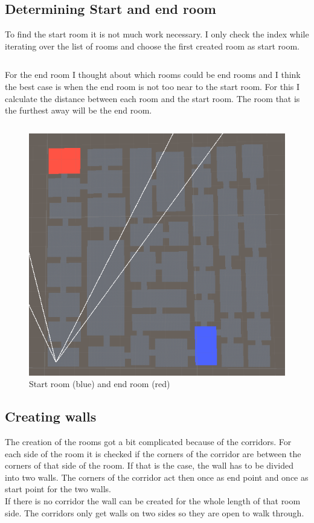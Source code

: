 \documentclass[a4paper,11pt,oneside]{scrreprt}
\begin{document}
\newpage
\subsection{Determining Start and end room}
To find the start room it is not much work necessary. I only check the index while iterating over the list of rooms and choose the first created room as start room. 
\inputminted[fontsize=\footnotesize,linenos]{csharp}{code/StartRoom.cs}

For the end room I thought about which rooms could be end rooms and I think the best case is when the end room is not too near to the start room. For this I calculate the distance between each room and the start room. The room that is the furthest away will be the end room.
\inputminted[fontsize=\footnotesize,linenos]{csharp}{code/EndRoom.cs}

\begin{figure}[htb]
	\centering
	\includegraphics[scale=0.7]{images/start_end_room.png}   
	\caption{Start room (blue) and end room (red)}
	\label{fig:start-end-room}
\end{figure}

\subsection{Creating walls}
The creation of the rooms got a bit complicated because of the corridors. For each side of the room it is checked if the corners of the corridor are between the corners of that side of the room. If that is the case, the wall has to be divided into two walls. The corners of the corridor act then once as end point and once as start point for the two walls. 
\\
If there is no corridor the wall can be created for the whole length of that room side. The corridors only get walls on two sides so they are open to walk through.
\inputminted[fontsize=\footnotesize,linenos]{csharp}{code/CreateWalls1.cs}
\end{document}
